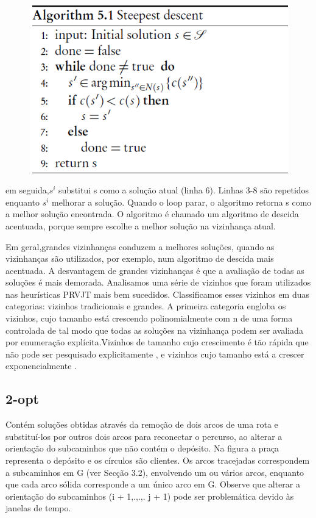 \begin{figure}[ht!]
\centering
\includegraphics[scale=0.8]{figuras/alg-1.PNG}
\label{alg-1}
\end{figure}

em seguida,$s^i$ substitui s como a solução atual (linha 6). Linhas 3-8 são repetidos enquanto $s^i$ melhorar a solução. Quando o loop parar, o algoritmo retorna s como a melhor solução encontrada. O algoritmo é chamado um algoritmo de descida acentuada, porque sempre escolhe a melhor solução na vizinhança atual.

Em geral,grandes vizinhanças conduzem a melhores soluções, quando as vizinhanças são utilizados, por exemplo, num algoritmo de descida mais acentuada. A desvantagem de grandes vizinhanças é que a avaliação de todas as soluções é mais demorada. Analisamos uma série de vizinhos que foram utilizados nas heurísticas PRVJT mais bem sucedidos. Classificamos esses vizinhos em duas categorias: vizinhos tradicionais e grandes. A primeira categoria engloba os vizinhos, cujo tamanho está crescendo polinomialmente com n de uma forma controlada de tal modo que todas as soluções na vizinhança podem ser avaliada por enumeração explícita.Vizinhos de tamanho cujo crescimento é tão rápida que não pode ser pesquisado explicitamente , e vizinhos cujo tamanho está a crescer exponencialmente \cite{ahuja00}. 

\subsection{2-opt}

Contém soluções obtidas através da remoção de dois arcos de uma rota e substituí-los por outros dois arcos para reconectar o percurso, ao alterar a orientação do subcaminhos que não contém o depósito. Na figura a praça representa o depósito e os círculos são clientes. Os arcos tracejadas correspondem a subcaminhos em G (ver Secção 3.2), envolvendo um ou vários arcos, enquanto que cada arco sólida corresponde a um único arco em G. Observe que alterar a orientação do subcaminhos (i + 1,.,.,. j + 1) pode ser problemática devido às janelas de tempo.


